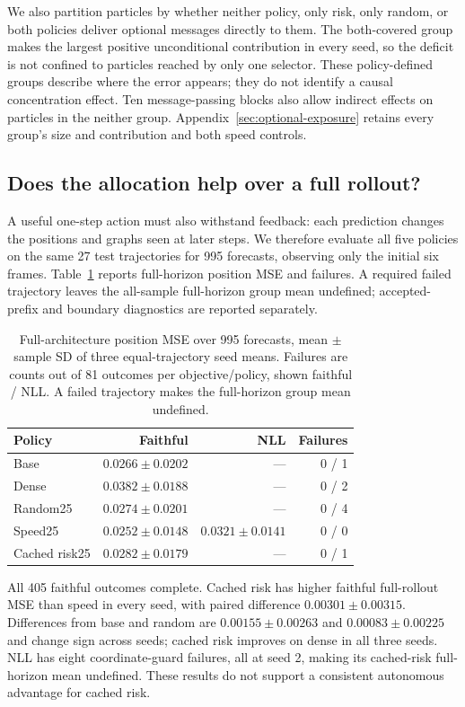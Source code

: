 We also partition particles by whether neither policy, only risk, only random, or both policies deliver optional messages directly to them. The both-covered group makes the largest positive unconditional contribution in every seed, so the deficit is not confined to particles reached by only one selector. These policy-defined groups describe where the error appears; they do not identify a causal concentration effect. Ten message-passing blocks also allow indirect effects on particles in the neither group. Appendix~\ref{sec:optional-exposure} retains every group's size and contribution and both speed controls.

\subsection{Does the allocation help over a full rollout?}
A useful one-step action must also withstand feedback: each prediction changes the positions and graphs seen at later steps. We therefore evaluate all five policies on the same 27 test trajectories for 995 forecasts, observing only the initial six frames. Table~\ref{tab:full-rollouts} reports full-horizon position MSE and failures. A required failed trajectory leaves the all-sample full-horizon group mean undefined; accepted-prefix and boundary diagnostics are reported separately.

\begin{table}[t]
\centering\small
\caption{Full-architecture position MSE over 995 forecasts, mean $\pm$ sample SD of three equal-trajectory seed means. Failures are counts out of 81 outcomes per objective/policy, shown faithful / NLL. A failed trajectory makes the full-horizon group mean undefined.}
\label{tab:full-rollouts}
\begin{tabular}{lrrr}
\toprule
Policy & Faithful & NLL & Failures\\
\midrule
Base & $0.0266\pm0.0202$ & --- & 0 / 1\\
Dense & $0.0382\pm0.0188$ & --- & 0 / 2\\
Random25 & $0.0274\pm0.0201$ & --- & 0 / 4\\
Speed25 & $0.0252\pm0.0148$ & $0.0321\pm0.0141$ & 0 / 0\\
Cached risk25 & $0.0282\pm0.0179$ & --- & 0 / 1\\
\bottomrule
\end{tabular}
\end{table}

All 405 faithful outcomes complete. Cached risk has higher faithful full-rollout MSE than speed in every seed, with paired difference $0.00301\pm0.00315$. Differences from base and random are $0.00155\pm0.00263$ and $0.00083\pm0.00225$ and change sign across seeds; cached risk improves on dense in all three seeds. NLL has eight coordinate-guard failures, all at seed 2, making its cached-risk full-horizon mean undefined. These results do not support a consistent autonomous advantage for cached risk.

